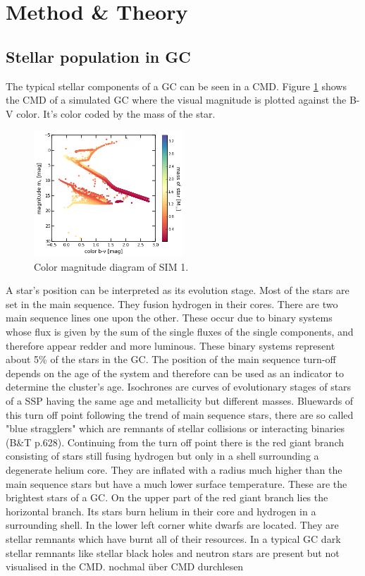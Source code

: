 \section{Method \& Theory}\label{method_theory}
\subsection{Stellar population in GC}\label{cmd_theory}
The typical stellar components of a \ac{GC} can be seen in a \ac{CMD}. Figure \ref{fig:cmd} shows the \ac{CMD} of a simulated \ac{GC} where the visual magnitude is plotted against the B-V color. It's color coded by the mass of the star. 
\begin{figure}[htbp]
\centering
	\includegraphics[width=0.5\textwidth]{Plots/color_magnitude_diagram.png}
	\caption{Color magnitude diagram of SIM 1.}
	\label{fig:cmd}
\end{figure}
A star's position can be interpreted as its evolution stage. Most of the stars are set in the main sequence. They fusion hydrogen in their cores. There are two main sequence lines one upon the other. These occur due to binary systems whose flux is given by the sum of the single fluxes of the single components, and therefore appear redder and more luminous. These binary systems represent about 5\% of the stars in the \ac{GC}. The position of the main sequence turn-off depends on the age of the system and therefore can be used as an indicator to determine the cluster's age. Isochrones are curves of evolutionary stages of stars of a \ac{SSP} having the same age and metallicity but different masses. Bluewards of this turn off point following the trend of main sequence stars, there are so called "blue stragglers" which are remnants of stellar collisions or interacting binaries (B\&T p.628). Continuing from the turn off point there is the red giant branch consisting of stars still fusing hydrogen but only in a shell surrounding a degenerate helium core. They are inflated with a radius much higher than the main sequence stars but have a much lower surface temperature. These are the brightest stars of a \ac{GC}. On the upper part of the red giant branch lies the horizontal branch. Its stars burn helium in their core and hydrogen in a surrounding shell. In the lower left corner white dwarfs are located. They are stellar remnants which have burnt all of their resources. In a typical \ac{GC} dark stellar remnants like stellar black holes and neutron stars are present but not visualised in the \ac{CMD}. \color{red} nochmal über \ac{CMD} durchlesen\color{black} 
